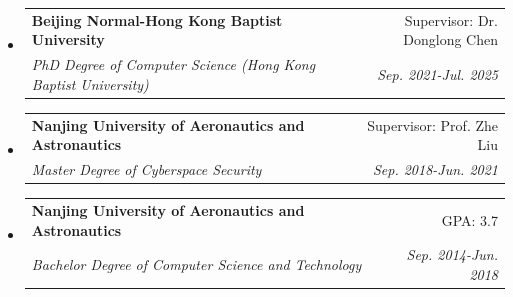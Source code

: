 \documentclass[letterpaper,11pt]{article}
\makeatletter
\newcommand{\resitem}[1]{\item #1 \vspace{-2pt}}
\newcommand{\ressubheading}[4]{
\begin{tabular*}{6.5in}{l@{\cftdotfill{\cftsecdotsep}\extracolsep{\fill}}r}
		\textbf{#1} & #2 \\
		\textit{#3} & \textit{#4} \\
\end{tabular*}\vspace{-6pt}}
\makeatother
\begin{document}
\begin{itemize}
\item
	\ressubheading{Beijing Normal-Hong Kong Baptist University}{Supervisor: Dr. Donglong Chen}{PhD Degree of Computer Science (Hong Kong Baptist University)}{Sep. 2021-Jul. 2025}
%
\item
	\ressubheading{Nanjing University of Aeronautics and Astronautics}{Supervisor: Prof. Zhe Liu}{Master Degree of Cyberspace Security}{Sep. 2018-Jun. 2021}
%

\item
	\ressubheading{Nanjing University of Aeronautics and Astronautics}{GPA: 3.7}{Bachelor Degree of Computer Science and Technology}{Sep. 2014-Jun. 2018}
%

\end{itemize}

%
\end{document}

